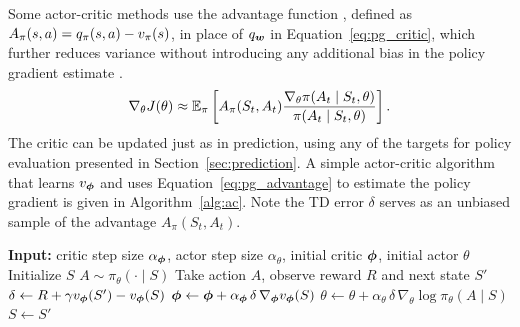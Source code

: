   Some actor-critic methods use the advantage function , defined as $A_\pi(s, a) = q_{\pi}(s, a) - v_{\pi}(s)$, in place of $q_{\bm w}$ in Equation~\eqref{eq:pg_critic}, which further reduces variance without introducing any additional bias in the policy gradient estimate \cite{sutton1998introduction}.
  \begin{equation}
      \nabla_\theta J(\theta) \approx \operatorname{\mathbb{E}}_\pi \left[ A_\pi(S_t, A_t) \frac{\nabla_\theta \pi(A_t \mid S_t, \theta)}{\pi(A_t \mid S_t, \theta)} \right].
      \label{eq:pg_advantage}
  \end{equation}
  The critic can be updated just as in prediction, using any of the targets for policy evaluation presented in Section~\ref{sec:prediction}. A simple actor-critic algorithm that learns $v_{\bm \phi}$ and uses Equation~\eqref{eq:pg_advantage} to estimate the policy gradient is given in Algorithm~\ref{alg:ac}. Note the TD error $\delta$ serves as an unbiased sample of the advantage $A_\pi(S_t, A_t)$.
  
  \begin{algorithm}[t]
  \caption{Actor-Critic with Advantage and TD(0) Target}
  \label{alg:ac}
  \begin{algorithmic}[1]
  \State \textbf{Input:} critic step size $\alpha_{{\bm \phi}}$, actor step size $\alpha_\theta$, initial critic ${\bm \phi}$, initial actor $\theta$
      \State Initialize $S$
          \State $A \sim \pi_\theta(\cdot \mid S)$
          \State Take action $A$, observe reward $R$ and next state $S'$
          \State $\delta \gets R + \gamma v_{\bm \phi}(S') - v_{\bm \phi}(S)$ 
          \State ${\bm \phi} \gets {\bm \phi} + \alpha_{{\bm \phi}}\, \delta\, \nabla_{{\bm \phi}} v_{\bm \phi}(S)$
          \State $\theta \gets \theta + \alpha_\theta\, \delta\, \nabla_\theta \log \pi_\theta(A \mid S)$
          \State $S \gets S'$
      \EndWhile
  \EndFor
  \end{algorithmic}
  \end{algorithm}
  
